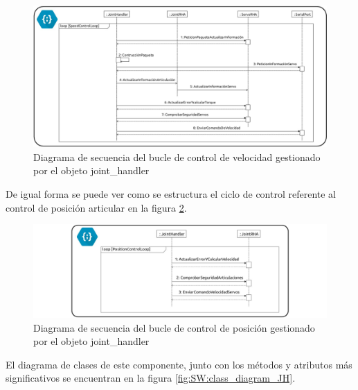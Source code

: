         \begin{figure}[H]
            \centering
            \includegraphics[width=1\textwidth]{figuras/Imagenes_SW/diagrama_secuencia_speed_control.jpg}
            \caption{Diagrama de secuencia del bucle de control de velocidad gestionado por el objeto joint\_handler}
            \label{fig:SW:joint_handler_loop}
        \end{figure}

        De igual forma se puede ver como se estructura el ciclo de control referente al control de posición articular en la figura \ref{fig:SW:joint_handler_loop_pos}.

       \begin{figure}[H]
	       	\centering
	       	\includegraphics[width=1\textwidth]{figuras/Imagenes_SW/diagrama_secuencia_position_control.jpg}
	       	\caption{Diagrama de secuencia del bucle de control de posición gestionado por el objeto joint\_handler}
	       	\label{fig:SW:joint_handler_loop_pos}
       \end{figure}

        El diagrama de clases de este componente, junto con los métodos y atributos más significativos se encuentran en la figura \ref{fig:SW:class_diagram_JH}.

